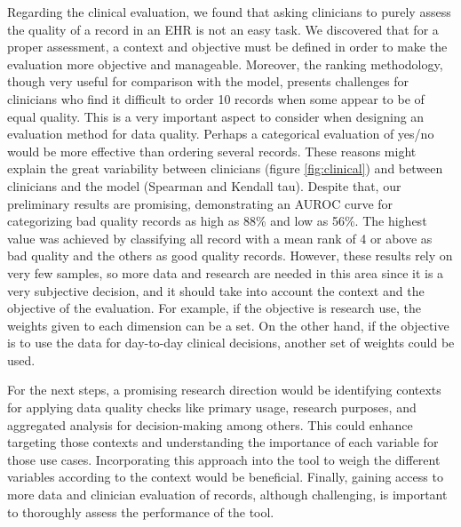 Regarding the clinical evaluation, we found that asking clinicians to purely assess the quality of a record in an EHR is not an easy task. We discovered that for a proper assessment, a context and objective must be defined in order to make the evaluation more objective and manageable. Moreover, the ranking methodology, though very useful for comparison with the model, presents challenges for clinicians who find it difficult to order 10 records when some appear to be of equal quality. This is a very important aspect to consider when designing an evaluation method for data quality. Perhaps a categorical evaluation of yes/no would be more effective than ordering several records. These reasons might explain the great variability between clinicians (figure \ref{fig:clinical}) and between clinicians and the model (Spearman and Kendall tau). Despite that, our preliminary results are promising, demonstrating an AUROC curve for categorizing bad quality records as high as 88\% and low as 56\%. The highest value was achieved by classifying all record with a mean rank of 4 or above as bad quality and the others as good quality records. However, these results rely on very few samples, so more data and research are needed in this area since it is a very subjective decision, and it should take into account the context and the objective of the evaluation. For example, if the objective is research use, the weights given to each dimension can be a set. On the other hand, if the objective is to use the data for day-to-day clinical decisions, another set of weights could be used. 

For the next steps, a promising research direction would be identifying contexts for applying data quality checks like primary usage, research purposes, and aggregated analysis for decision-making among others. This could enhance targeting those contexts and understanding the importance of each variable for those use cases. Incorporating this approach into the tool to weigh the different variables according to the context would be beneficial.  Finally, gaining access to more data and clinician evaluation of records, although challenging, is important to thoroughly assess the performance of the tool.

